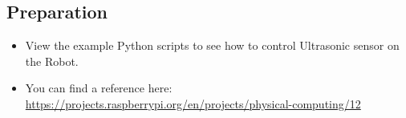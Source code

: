 

\subsection*{\Large Preparation}

    \begin{itemize}
        \item View the example Python scripts to see how to control Ultrasonic sensor on the Robot.\\
        
        \item You can find a reference here:\\
        \small{\url{https://projects.raspberrypi.org/en/projects/physical-computing/12}}\\ 
        
    \end{itemize}